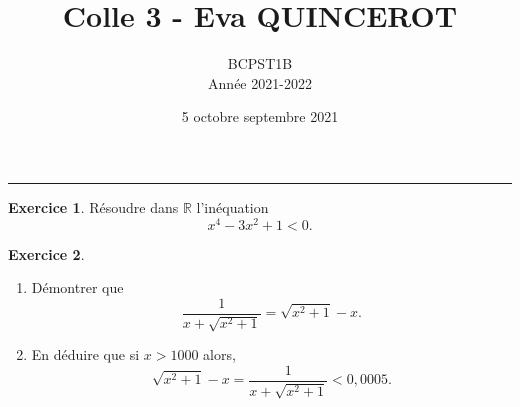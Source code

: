 \documentclass[a4paper, 11pt,openany]{article}%
\title{Colle 3 - Eva QUINCEROT}
\author{BCPST1B\\
Année 2021-2022}
\date{5 octobre septembre 2021}
\theoremstyle{plain}
\theoremstyle{definition}
\newtheorem{exo}{Exercice}
\newtheorem{sol}{Solution de l'exercice}
\theoremstyle{remark}
\newcommand{\R}{\mathbb{R}}
\begin{document}
   \maketitle
      \rule{\linewidth}{0.5mm}


\begin{exo}
Résoudre dans $\R$ l'inéquation
\[ x^4 - 3x^2 +1 < 0.\]
\end{exo}


\begin{exo}
\begin{enumerate}
\item Démontrer que
\[ \frac{1}{x + \sqrt{x^2 +1 }} = \sqrt{x^2 +1} - x .\]
\item En déduire que si $x > 1000$ alors,
\[ \sqrt{x^2+1}-x = \frac{1}{x + \sqrt{x^2 +1 }} <  0,0005.\] 
\end{enumerate}
\end{exo}

\end{document}
